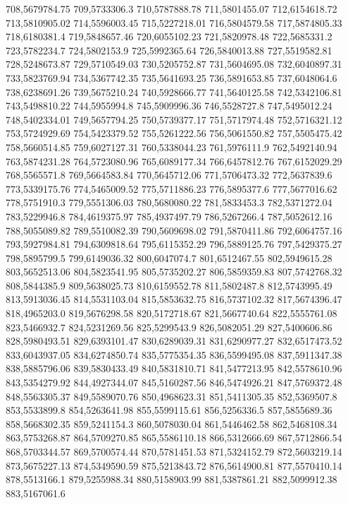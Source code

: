 708,5679784.75
709,5733306.3
710,5787888.78
711,5801455.07
712,6154618.72
713,5810905.02
714,5596003.45
715,5227218.01
716,5804579.58
717,5874805.33
718,6180381.4
719,5848657.46
720,6055102.23
721,5820978.48
722,5685331.2
723,5782234.7
724,5802153.9
725,5992365.64
726,5840013.88
727,5519582.81
728,5248673.87
729,5710549.03
730,5205752.87
731,5604695.08
732,6040897.31
733,5823769.94
734,5367742.35
735,5641693.25
736,5891653.85
737,6048064.6
738,6238691.26
739,5675210.24
740,5928666.77
741,5640125.58
742,5342106.81
743,5498810.22
744,5955994.8
745,5909996.36
746,5528727.8
747,5495012.24
748,5402334.01
749,5657794.25
750,5739377.17
751,5717974.48
752,5716321.12
753,5724929.69
754,5423379.52
755,5261222.56
756,5061550.82
757,5505475.42
758,5660514.85
759,6027127.31
760,5338044.23
761,5976111.9
762,5492140.94
763,5874231.28
764,5723080.96
765,6089177.34
766,6457812.76
767,6152029.29
768,5565571.8
769,5664583.84
770,5645712.06
771,5706473.32
772,5637839.6
773,5339175.76
774,5465009.52
775,5711886.23
776,5895377.6
777,5677016.62
778,5751910.3
779,5551306.03
780,5680080.22
781,5833453.3
782,5371272.04
783,5229946.8
784,4619375.97
785,4937497.79
786,5267266.4
787,5052612.16
788,5055089.82
789,5510082.39
790,5609698.02
791,5870411.86
792,6064757.16
793,5927984.81
794,6309818.64
795,6115352.29
796,5889125.76
797,5429375.27
798,5895799.5
799,6149036.32
800,6047074.7
801,6512467.55
802,5949615.28
803,5652513.06
804,5823541.95
805,5735202.27
806,5859359.83
807,5742768.32
808,5844385.9
809,5638025.73
810,6159552.78
811,5802487.8
812,5743995.49
813,5913036.45
814,5531103.04
815,5853632.75
816,5737102.32
817,5674396.47
818,4965203.0
819,5676298.58
820,5172718.67
821,5667740.64
822,5555761.08
823,5466932.7
824,5231269.56
825,5299543.9
826,5082051.29
827,5400606.86
828,5980493.51
829,6393101.47
830,6289039.31
831,6290977.27
832,6517473.52
833,6043937.05
834,6274850.74
835,5775354.35
836,5599495.08
837,5911347.38
838,5885796.06
839,5830433.49
840,5831810.71
841,5477213.95
842,5578610.96
843,5354279.92
844,4927344.07
845,5160287.56
846,5474926.21
847,5769372.48
848,5563305.37
849,5589070.76
850,4968623.31
851,5411305.35
852,5369507.8
853,5533899.8
854,5263641.98
855,5599115.61
856,5256336.5
857,5855689.36
858,5668302.35
859,5241154.3
860,5078030.04
861,5446462.58
862,5468108.34
863,5753268.87
864,5709270.85
865,5586110.18
866,5312666.69
867,5712866.54
868,5703344.57
869,5700574.44
870,5781451.53
871,5324152.79
872,5603219.14
873,5675227.13
874,5349590.59
875,5213843.72
876,5614900.81
877,5570410.14
878,5513166.1
879,5255988.34
880,5158903.99
881,5387861.21
882,5099912.38
883,5167061.6
